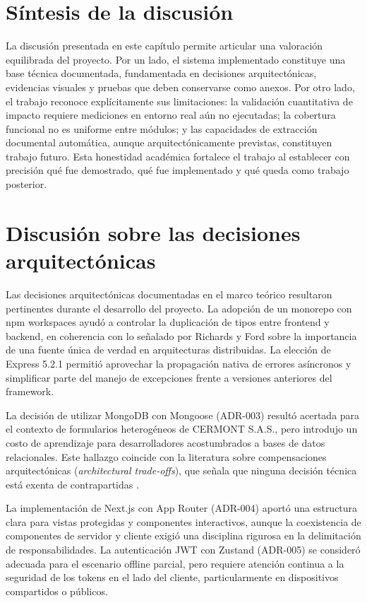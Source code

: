\section{Síntesis de la discusión}
\label{sec:sintesis-final-discusion}

La discusión presentada en este capítulo permite articular una valoración equilibrada del proyecto. Por un lado, el sistema implementado constituye una base técnica documentada, fundamentada en decisiones arquitectónicas, evidencias visuales y pruebas que deben conservarse como anexos. Por otro lado, el trabajo reconoce explícitamente sus limitaciones: la validación cuantitativa de impacto requiere mediciones en entorno real aún no ejecutadas; la cobertura funcional no es uniforme entre módulos; y las capacidades de extracción documental automática, aunque arquitectónicamente previstas, constituyen trabajo futuro. Esta honestidad académica fortalece el trabajo al establecer con precisión qué fue demostrado, qué fue implementado y qué queda como trabajo posterior.

\section{Discusión sobre las decisiones arquitectónicas}
\label{sec:discusion-arquitectura}

Las decisiones arquitectónicas documentadas en el marco teórico resultaron pertinentes durante el desarrollo del proyecto. La adopción de un monorepo con npm workspaces ayudó a controlar la duplicación de tipos entre frontend y backend, en coherencia con lo señalado por Richards y Ford \cite{richards2020} sobre la importancia de una fuente única de verdad en arquitecturas distribuidas. La elección de Express 5.2.1 permitió aprovechar la propagación nativa de errores asíncronos y simplificar parte del manejo de excepciones frente a versiones anteriores del framework.

La decisión de utilizar MongoDB con Mongoose (ADR-003) resultó acertada para el contexto de formularios heterogéneos de CERMONT S.A.S., pero introdujo un costo de aprendizaje para desarrolladores acostumbrados a bases de datos relacionales. Este hallazgo coincide con la literatura sobre compensaciones arquitectónicas (\textit{architectural trade-offs}), que señala que ninguna decisión técnica está exenta de contrapartidas \cite{bass2021}.

La implementación de Next.js con App Router (ADR-004) aportó una estructura clara para vistas protegidas y componentes interactivos, aunque la coexistencia de componentes de servidor y cliente exigió una disciplina rigurosa en la delimitación de responsabilidades. La autenticación JWT con Zustand (ADR-005) se consideró adecuada para el escenario offline parcial, pero requiere atención continua a la seguridad de los tokens en el lado del cliente, particularmente en dispositivos compartidos o públicos.

